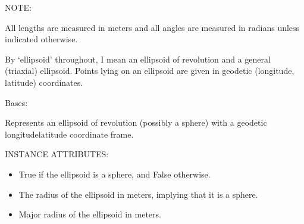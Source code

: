 \documentclass[a4paper,12ptopenany,oneside,english]{sphinxmanual}
\begin{document}
\sphinxAtStartPar
NOTE:

\sphinxAtStartPar
All lengths are measured in meters and all angles are measured in radians
unless indicated otherwise.

\sphinxAtStartPar
By ‘ellipsoid’ throughout, I mean an ellipsoid of revolution and  a general (triaxial) ellipsoid.
Points lying on an ellipsoid are given in geodetic (longitude, latitude) coordinates.

\begin{fulllineitems}
\label{\detokenize{ellipsoids:rhealpixdggs.ellipsoids.Ellipsoid}}
\pysigstartsignatures
\pysiglinewithargsret
{}
{\sphinxparamcomma {}\sphinxparamcomma {}\sphinxparamcomma {}\sphinxparamcomma {}\sphinxparamcomma {}\sphinxparamcomma {}\sphinxparamcomma {}}
{}
\pysigstopsignatures
\sphinxAtStartPar
Bases: 

\sphinxAtStartPar
Represents an ellipsoid of revolution (possibly a sphere) with a
geodetic longitude\sphinxhyphen{}latitude coordinate frame.

\sphinxAtStartPar
INSTANCE ATTRIBUTES:
\begin{itemize}
\item {} 
\sphinxAtStartPar
{} \sphinxhyphen{} True if the ellipsoid is a sphere, and False otherwise.

\item {} 
\sphinxAtStartPar
{} \sphinxhyphen{} The radius of the ellipsoid in meters, implying that it is a
sphere.

\item {} 
\sphinxAtStartPar
{} \sphinxhyphen{} Major radius of the ellipsoid in meters.


\end{itemize}
\end{fulllineitems}
\end{document}
